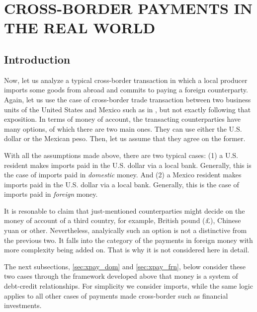 \newpage

\section{\MakeUppercase{Cross-Border Payments in the Real World}}\label{sec:payments}


\subsection{Introduction}

Now, let us analyze a typical cross-border transaction in which a local producer imports some goods from abroad and commits to paying a foreign counterparty. Again, let us use the case of cross-border trade transaction between two business units of the United States and Mexico such as in \citep[p.~500-501]{lavoie2022}, but not exactly following that exposition. In terms of money of account, the transacting counterparties have many options, of which there are two main ones. They can use either the U.S. dollar or the Mexican peso. Then, let us assume that they agree on the former. 

With all the assumptions made above, there are two typical cases: (1) a U.S. resident makes imports paid in the U.S. dollar via a local bank. Generally, this is the case of imports paid in \textit{domestic} money. And (2) a Mexico resident makes imports paid in the U.S. dollar via a local bank. Generally, this is the case of imports paid in \textit{foreign} money.

It is resonable to claim that just-mentioned counterparties might decide on the money of account of a third country, for example, British pound (\pounds), Chinese yuan or other. Nevertheless, analyically such an option is not a distinctive from the previous two. It falls into the category of the payments in foreign money with more complexity being added on. That is why it is not considered here in detail.

The next subsections, \ref{sec:xpay_dom} and \ref{sec:xpay_frn}, below consider these two cases through the framework developed above that money is a system of debt-credit relationships. For simplicity we consider imports, while the same logic applies to all other cases of payments made cross-border such as financial investments.

